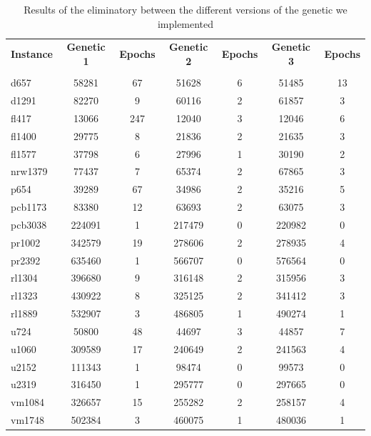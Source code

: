 \begin{table}[h!]
	\begin{center}
		\begin{tabular}{l|c|c|c|c|c|c}
			\textbf{Instance} & \textbf{Genetic 1} & \textbf{Epochs} & \textbf{Genetic 2} & \textbf{Epochs} & \textbf{Genetic 3} & \textbf{Epochs}\\
			& & & & & & \\
			\hline
			d657 & 58281 & 67 & 51628 & 6 & 51485 & 13 \\
			d1291 & 82270 & 9 & 60116 & 2 & 61857 & 3 \\
			fl417 & 13066 & 247 & 12040 & 3 & 12046 & 6 \\
			fl1400 & 29775 & 8 & 21836 & 2 & 21635 & 3 \\
			fl1577 & 37798 & 6 & 27996 & 1 & 30190 & 2 \\
			nrw1379 & 77437 & 7 & 65374 & 2 & 67865 & 3 \\
			p654 & 39289 & 67 & 34986 & 2 & 35216 & 5 \\
			pcb1173 & 83380 & 12 & 63693 & 2 & 63075 & 3 \\
			pcb3038 & 224091 & 1 & 217479 & 0 & 220982 & 0 \\
			pr1002 & 342579 & 19 & 278606 & 2 & 278935 & 4 \\
			pr2392 & 635460 & 1 & 566707 & 0 & 576564 & 0 \\
			rl1304 & 396680 & 9 & 316148 & 2 & 315956 & 3 \\
			rl1323 & 430922 & 8 & 325125 & 2 & 341412 & 3 \\
			rl1889 & 532907 & 3 & 486805 & 1 & 490274 & 1 \\
			u724 & 50800 & 48 & 44697 & 3 & 44857 & 7 \\
			u1060 & 309589 & 17 & 240649 & 2 & 241563 & 4 \\
			u2152 & 111343 & 1 & 98474 & 0 & 99573 & 0 \\
			u2319 & 316450 & 1 & 295777 & 0 & 297665 & 0 \\
			vm1084 & 326657 & 15 & 255282 & 2 & 258157 & 4 \\
			vm1748 & 502384 & 3 & 460075 & 1 & 480036 & 1 \\
		\end{tabular}
		\caption{Results of the eliminatory between the different versions of the genetic we implemented}
	\end{center}
\end{table}

